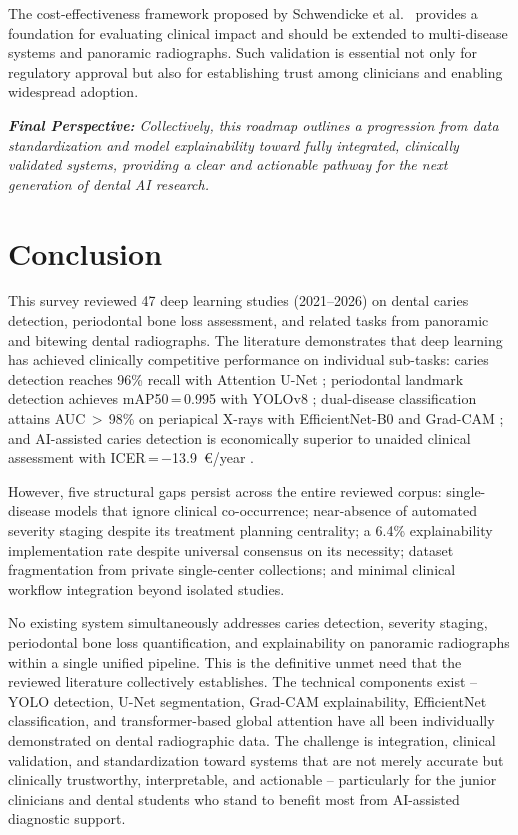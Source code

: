 \documentclass[conference]{IEEEtran}
\begin{document}
The cost-effectiveness framework proposed by Schwendicke et al.\
\cite{schwendicke2021cost} provides a foundation for evaluating
clinical impact and should be extended to multi-disease systems and
panoramic radiographs. Such validation is essential not only for
regulatory approval but also for establishing trust among clinicians
and enabling widespread adoption.

\vspace{4pt}
\noindent\textit{\textbf{Final Perspective:} Collectively, this roadmap
outlines a progression from data standardization and model
explainability toward fully integrated, clinically validated systems,
providing a clear and actionable pathway for the next generation of
dental AI research.}
\section{Conclusion}
\label{sec:conclusion}

This survey reviewed 47 deep learning studies (2021--2026) on dental
caries detection, periodontal bone loss assessment, and related tasks
from panoramic and bitewing dental radiographs. The literature
demonstrates that deep learning has achieved clinically competitive
performance on individual sub-tasks: caries detection reaches 96\%
recall with Attention U-Net \cite{pornprasertsuk2025clinical};
periodontal landmark detection achieves mAP50\,=\,0.995 with YOLOv8
\cite{jundaeng2025advanced}; dual-disease classification attains
AUC\,$>$\,98\% on periapical X-rays with EfficientNet-B0 and Grad-CAM
\cite{chen2023deep}; and AI-assisted caries detection is economically
superior to unaided clinical assessment with
ICER\,=\,$-$13.9~\euro/year \cite{schwendicke2021cost}.

However, five structural gaps persist across the entire reviewed corpus:
single-disease models that ignore clinical co-occurrence; near-absence of
automated severity staging despite its treatment planning centrality; a
6.4\% explainability implementation rate despite universal consensus on
its necessity; dataset fragmentation from private single-center
collections; and minimal clinical workflow integration beyond isolated
studies.

No existing system simultaneously addresses caries detection, severity
staging, periodontal bone loss quantification, and explainability on
panoramic radiographs within a single unified pipeline. This is the
definitive unmet need that the reviewed literature collectively
establishes. The technical components exist -- YOLO detection, U-Net
segmentation, Grad-CAM explainability, EfficientNet classification, and
transformer-based global attention have all been individually
demonstrated on dental radiographic data. The challenge is integration,
clinical validation, and standardization toward systems that are not
merely accurate but clinically trustworthy, interpretable, and
actionable -- particularly for the junior clinicians and dental students
who stand to benefit most from AI-assisted diagnostic support.
\end{document}
